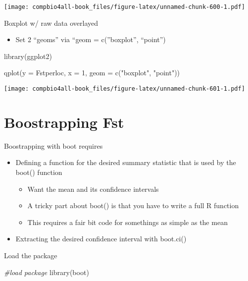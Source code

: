 \documentclass[
]{book}
\newenvironment{Shaded}{\begin{snugshade}}{\end{snugshade}}
\newcommand{\AttributeTok}[1]{\textcolor[rgb]{0.77,0.63,0.00}{#1}}
\newcommand{\CommentTok}[1]{\textcolor[rgb]{0.56,0.35,0.01}{\textit{#1}}}
\newcommand{\DecValTok}[1]{\textcolor[rgb]{0.00,0.00,0.81}{#1}}
\newcommand{\FunctionTok}[1]{\textcolor[rgb]{0.00,0.00,0.00}{#1}}
\newcommand{\NormalTok}[1]{#1}
\newcommand{\StringTok}[1]{\textcolor[rgb]{0.31,0.60,0.02}{#1}}
\providecommand{\tightlist}{%
  \setlength{\itemsep}{0pt}\setlength{\parskip}{0pt}}
\begin{document}
\texttt{[image: compbio4all-book\_files/figure-latex/unnamed-chunk-600-1.pdf]}

Boxplot w/ raw data overlayed

\begin{itemize}
\tightlist
\item
  Set 2 ``geoms'' via ``geom = c(''boxplot'', ``point'')
\end{itemize}

\begin{Shaded}
\begin{Highlighting}[]
\FunctionTok{library}\NormalTok{(ggplot2)}

\FunctionTok{qplot}\NormalTok{(}\AttributeTok{y =}\NormalTok{ Fstperloc,}
      \AttributeTok{x =} \DecValTok{1}\NormalTok{, }
      \AttributeTok{geom =} \FunctionTok{c}\NormalTok{(}\StringTok{"boxplot"}\NormalTok{,}
               \StringTok{"point"}\NormalTok{))}
\end{Highlighting}
\end{Shaded}

\texttt{[image: compbio4all-book\_files/figure-latex/unnamed-chunk-601-1.pdf]}

\hypertarget{boostrapping-fst}{%
\chapter{Boostrapping Fst}\label{boostrapping-fst}}

Boostrapping with boot requires

\begin{itemize}
\tightlist
\item
  Defining a function for the desired summary statistic that is used by the boot() function

  \begin{itemize}
  \tightlist
  \item
    Want the mean and its confidence intervals
  \item
    A tricky part about boot() is that you have to write a full R function
  \item
    This requires a fair bit code for somethings as simple as the mean
  \end{itemize}
\item
  Extracting the desired confidence interval with boot.ci()
\end{itemize}

Load the package

\begin{Shaded}
\begin{Highlighting}[]
\CommentTok{\#load package}
\FunctionTok{library}\NormalTok{(boot)}
\end{Highlighting}
\end{Shaded}
\end{document}

